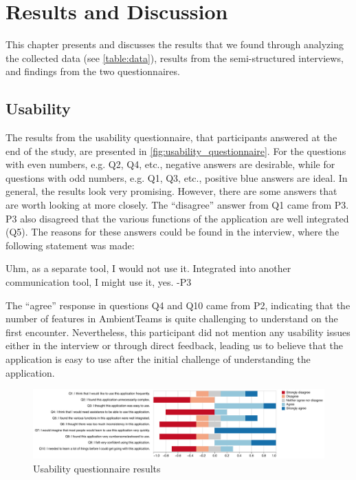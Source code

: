 \chapter{Results and Discussion}
\label{chapter:results_and_discussion}

This chapter presents and discusses the results that we found through analyzing the collected data (see \autoref{table:data}), results from the semi-structured interviews, and findings from the two questionnaires.

\section{Usability}
\label{section:usability}

The results from the usability questionnaire, that participants answered at the end of the study, are presented in \autoref{fig:usability_questionnaire}. For the questions with even numbers, e.g. Q2, Q4, etc., negative answers are desirable, while for questions with odd numbers, e.g. Q1, Q3, etc., positive blue answers are ideal. In general, the results look very promising. However, there are some answers that are worth looking at more closely. The \enquote{disagree} answer from Q1 came from P3. P3 also disagreed that the various functions of the application are well integrated (Q5). The reasons for these answers could be found in the interview, where the following statement was made:

\begin{displayquote}
    Uhm, as a separate tool, I would not use it. Integrated into another communication tool, I might use it, yes. -P3
\end{displayquote}

The \enquote{agree} response in questions Q4 and Q10 came from P2, indicating that the number of features in AmbientTeams is quite challenging to understand on the first encounter. Nevertheless, this participant did not mention any usability issues either in the interview or through direct feedback, leading us to believe that the application is easy to use after the initial challenge of understanding the application.

\begin{figure}[h]
    \centering
    \includegraphics[width=\linewidth]{plots/usability_likert.pdf}
    \caption{Usability questionnaire results}
    \label{fig:usability_questionnaire}
\end{figure}

